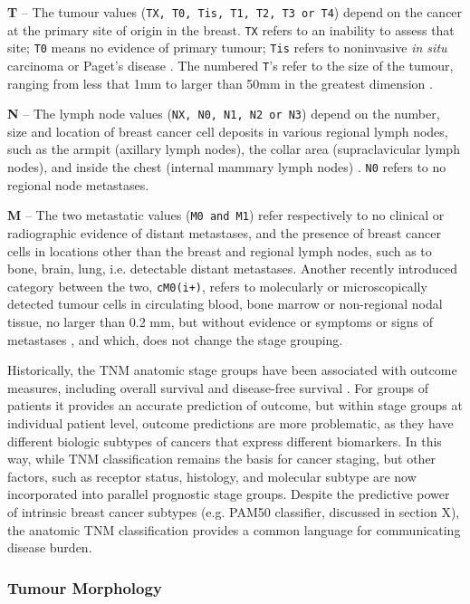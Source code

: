     \textbf{T} – The tumour values (\texttt{TX, T0, Tis, T1, T2, T3 or T4}) depend on the cancer at the primary site of origin in the breast. \texttt{TX} refers to an inability to assess that site; \texttt{T0} means no evidence of primary tumour;  \texttt{Tis} refers to noninvasive \textit{in situ} carcinoma or Paget's disease \cite{Giuliano2017}. The numbered \texttt{T}'s refer to the size of the tumour, ranging from less that 1mm to larger than 50mm in the greatest dimension \cite{2017AJCCStaging}. 

    \textbf{N} – The lymph node values (\texttt{NX, N0, N1, N2 or N3}) depend on the number, size and location of breast cancer cell deposits in various regional lymph nodes, such as the armpit (axillary lymph nodes), the collar area (supraclavicular lymph nodes), and inside the chest (internal mammary lymph nodes) \cite{scatarige1990}. \texttt{N0} refers to no regional node metastases. 
    
    
    \textbf{M} – The two metastatic values (\texttt{M0 and M1}) refer respectively to no clinical or radiographic evidence of distant metastases, and the presence of breast cancer cells in locations other than the breast and regional lymph nodes, such as to bone, brain, lung, i.e. detectable distant metastases. Another recently introduced category between the two, \texttt{cM0(i+)}, refers to molecularly or microscopically detected tumour cells in circulating blood, bone marrow or non-regional nodal tissue, no larger than 0.2 mm, but without evidence or symptoms or signs of metastases \cite{Giuliano2017}, and which, does not change the stage grouping. 
    
    
    Historically, the TNM anatomic stage groups have been associated with outcome measures, including overall survival and disease-free survival \cite{Giuliano2017}.  For groups of patients it provides an accurate prediction of outcome, but within stage groups at individual patient level, outcome predictions are more problematic, as they have different biologic subtypes of cancers that express different biomarkers. In this way, while TNM classification remains the basis for cancer staging, but other factors, such as receptor status, histology, and molecular subtype are now incorporated into parallel prognostic stage groups. Despite the predictive power of intrinsic breast cancer subtypes (e.g. PAM50 classifier, discussed in section X),  the anatomic TNM classification provides a common language for communicating disease burden.

   \subsubsection{Tumour Morphology}
   
